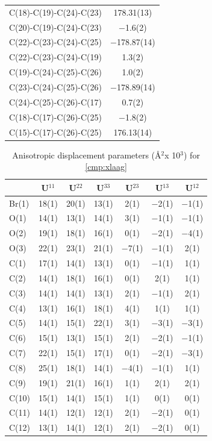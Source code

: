 \begin{center}
{\begin{supertabular}{p{1.5in}c}
C(18)-C(19)-C(24)-C(23)&178.31(13)\\
C(20)-C(19)-C(24)-C(23)&$-$1.6(2)\\
C(22)-C(23)-C(24)-C(25)&$-$178.87(14)\\
C(22)-C(23)-C(24)-C(19)&1.3(2)\\
C(19)-C(24)-C(25)-C(26)&1.0(2)\\
C(23)-C(24)-C(25)-C(26)&$-$178.89(14)\\
C(24)-C(25)-C(26)-C(17)&0.7(2)\\
C(18)-C(17)-C(26)-C(25)&$-$1.8(2)\\
C(15)-C(17)-C(26)-C(25)&176.13(14)\\
\end{supertabular}
}
\end{center}

\onecolumn
\begin{table}[h]
\centering
\caption{Anisotropic displacement parameters (\AA$^2$x 10$^3$) for \ref{cmp:xlaag}} 
\footnotesize
\begin{tabular}{p{1in}cccccc} 
\toprule
& U$^{11}$ & U$^{22}$ & U$^{33}$ & U$^{23}$ & U$^{13}$ & U$^{12}$ \\
\midrule
Br(1)&18(1) &20(1)&13(1) &2(1)&$-$2(1) &$-$1(1)\\
O(1)&14(1) &13(1)&14(1) &3(1)&$-$1(1) &$-$1(1)\\
O(2)&19(1) &18(1)&16(1) &0(1)&$-$2(1) &$-$4(1)\\
O(3)&22(1) &23(1)&21(1) &$-$7(1)&$-$1(1) &2(1)\\
C(1)&17(1) &14(1)&13(1) &0(1)&$-$1(1) &1(1)\\
C(2)&14(1) &18(1)&16(1) &0(1)&2(1) &1(1)\\
C(3)&14(1) &14(1)&13(1) &2(1)&$-$1(1) &2(1)\\
C(4)&13(1) &16(1)&18(1) &4(1)&1(1) &1(1)\\
C(5)&14(1) &15(1)&22(1) &3(1)&$-$3(1) &$-$3(1)\\
C(6)&15(1) &13(1)&15(1) &2(1)&$-$2(1) &$-$1(1)\\
C(7)&22(1) &15(1)&17(1) &0(1)&$-$2(1) &$-$3(1)\\
C(8)&25(1) &18(1)&14(1) &$-$4(1)&$-$1(1) &1(1)\\
C(9)&19(1) &21(1)&16(1) &1(1)&2(1) &2(1)\\
C(10)&15(1) &14(1)&15(1) &1(1)&0(1) &0(1)\\
C(11)&14(1) &12(1)&12(1) &2(1)&$-$2(1) &0(1)\\
C(12)&13(1) &14(1)&12(1) &2(1)&$-$2(1) &0(1)\\

\end{tabular}
\end{table}
